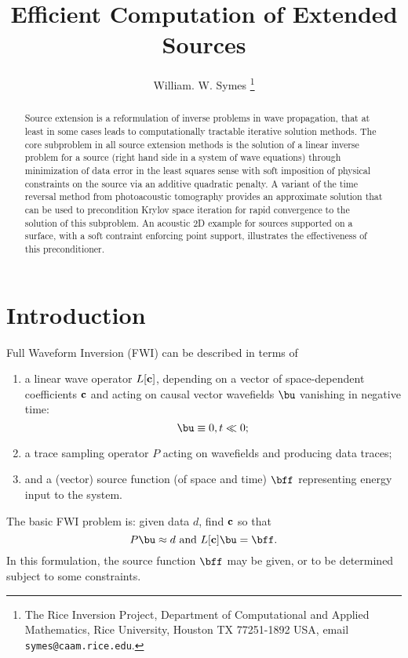\title{Efficient Computation of Extended Sources}
\author{William. W. Symes \thanks{The Rice Inversion Project,
Department of Computational and Applied Mathematics, Rice University,
Houston TX 77251-1892 USA, email {\tt symes@caam.rice.edu}.}}



\maketitle
\begin{abstract}
Source extension is a reformulation of inverse problems in wave propagation, that at least in some cases leads to computationally tractable iterative solution methods. The core subproblem in all source extension methods is the solution of a linear inverse problem for a source (right hand side in a system of wave equations) through minimization of data error in the least squares sense with soft imposition of physical constraints on the source via an additive quadratic penalty. A variant of the time reversal method from photoacoustic tomography provides an approximate solution that can be used to precondition Krylov space iteration for rapid convergence to the solution of this subproblem. An acoustic 2D example for sources supported on a surface, with a soft contraint enforcing point support, illustrates the effectiveness of this preconditioner.
\end{abstract}

\section{Introduction}
Full Waveform Inversion (FWI) can be described in terms of 
\begin{enumerate}
\item a linear wave operator $L[{\bf c}]$, depending on a vector of
  space-dependent coefficients ${\bf c}$ and acting on causal vector wavefields $\bu$ vanishing in negative time:
\begin{equation}
\label{eqn:init}
\bu \equiv 0, t \ll 0; 
\end{equation}
\item a trace sampling operator $P$ acting on wavefields and producing data traces;
\item and a (vector) source function (of space and time) $\bff$ representing energy input to the system. 
\end{enumerate}
The basic FWI problem is: given data $d$, find ${\bf c}$ so that 
\begin{equation}
\label{eqn:fwi}
P\bu \approx d \mbox{ and } L[\bf{c}]\bu = \bff.
\end{equation}
In this formulation, the source function $\bff$ may be given, or
to be determined subject to some constraints.

